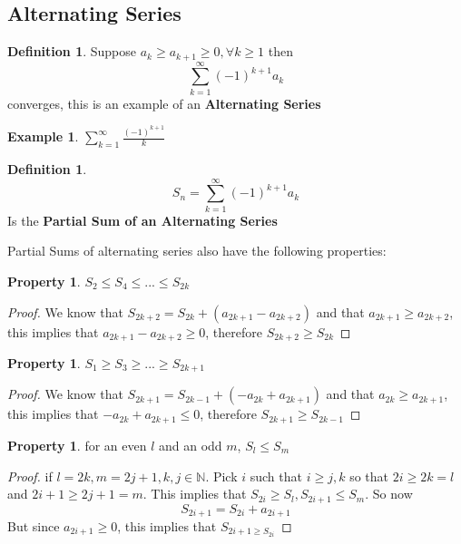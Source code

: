 \documentclass[12pt]{article}
\theoremstyle{plain}
\theoremstyle{definition}
\newtheorem{definition}[theorem]{Definition}
\newtheorem{example}[theorem]{Example}
\newtheorem{property}[theorem]{Property}
\begin{document}
\subsection{Alternating Series}

\begin{definition}
	Suppose $a_k \geq a_{k+1} \geq 0, \forall k \geq 1$ then
	$$\sum^\infty_{k=1} (-1)^{k+1} a_k$$ converges, this is an example of an \textbf{Alternating Series}
\end{definition}

\begin{example}
	$\sum^\infty_{k=1} \frac{(-1)^{k+1}}{k}$
\end{example}

\begin{definition}
	$$S_n = \sum^\infty_{k=1} (-1)^{k+1} a_k$$
	Is the \textbf{Partial Sum of an Alternating Series}
\end{definition}

Partial Sums of alternating series also have the following properties:

\begin{property}
	$S_2 \leq S_4 \leq ... \leq S_{2k}$
\end{property}

\begin{proof}
	We know that $S_{2k+2} = S_{2k} + (a_{2k+1} - a_{2k+2})$ and that $a_{2k+1} \geq a_{2k+2}$, this implies that $a_{2k+1} - a_{2k+2} \geq 0$, therefore $S_{2k+2} \geq S_{2k}$
\end{proof}

\begin{property}
	$S_1 \geq S_3 \geq ... \geq S_{2k+1}$
\end{property}

\begin{proof}
	We know that $S_{2k+1} = S_{2k-1} + (-a_{2k} + a_{2k+1})$ and that $a_{2k} \geq a_{2k+1}$, this implies that $-a_{2k} + a_{2k+1} \leq 0$, therefore $S_{2k+1} \geq S_{2k-1}$
\end{proof}

\begin{property}
	for an even $l$ and an odd $m$, $S_l \leq S_m$
\end{property}

\begin{proof}
	if $l=2k, m=2j+1, k,j \in \mathbb{N}$. Pick $i$ such that $i \geq j,k$ so that $2i \geq 2k = l$ and $2i+1 \geq 2j+1 = m$. This implies that $S_{2i} \geq S_{l}, S_{2i+1} \leq S_m$.
	So now $$S_{2i+1} = S_{2i} + a_{2i+1}$$
	But since $a_{2i+1} \geq 0$, this implies that $S_{2i+1 \geq S_{2i}}$
\end{proof}
\end{document}
